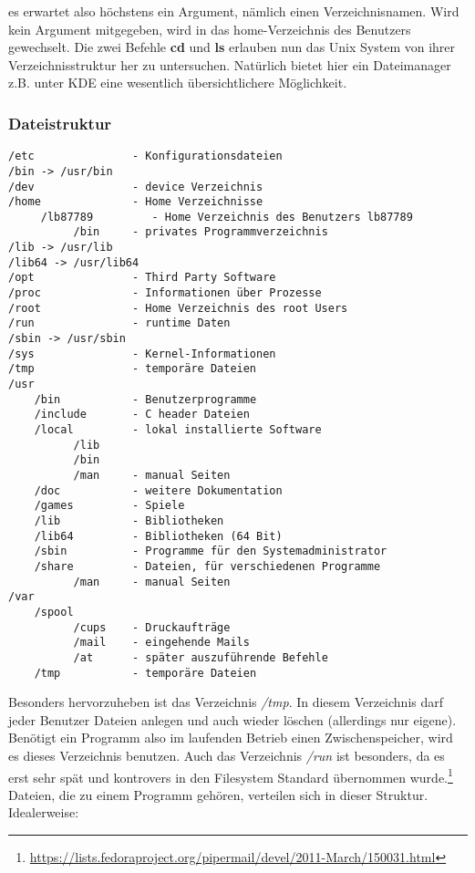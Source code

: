 \documentclass[titlepage,a4paper]{article}
\begin{document}
es erwartet also höchstens ein Argument, nämlich einen Verzeichnisnamen.  Wird
kein Argument mitgegeben, wird in das home-Verzeichnis des Benutzers
gewechselt.  Die zwei Befehle \textbf{cd} und \textbf{ls} erlauben nun das
Unix System von ihrer Verzeichnisstruktur her zu untersuchen.  Natürlich
bietet hier ein Dateimanager z.B. unter KDE eine wesentlich übersichtlichere
Möglichkeit.

\subsubsection*{Dateistruktur}

\begin{verbatim}
/etc               - Konfigurationsdateien
/bin -> /usr/bin
/dev               - device Verzeichnis
/home              - Home Verzeichnisse
     /lb87789         - Home Verzeichnis des Benutzers lb87789
          /bin     - privates Programmverzeichnis
/lib -> /usr/lib
/lib64 -> /usr/lib64
/opt               - Third Party Software
/proc              - Informationen über Prozesse
/root              - Home Verzeichnis des root Users
/run               - runtime Daten
/sbin -> /usr/sbin
/sys               - Kernel-Informationen
/tmp               - temporäre Dateien
/usr
    /bin           - Benutzerprogramme
    /include       - C header Dateien
    /local         - lokal installierte Software
          /lib
          /bin
          /man     - manual Seiten
    /doc           - weitere Dokumentation
    /games         - Spiele
    /lib           - Bibliotheken
    /lib64         - Bibliotheken (64 Bit)
    /sbin          - Programme für den Systemadministrator
    /share         - Dateien, für verschiedenen Programme
          /man     - manual Seiten
/var
    /spool
          /cups    - Druckaufträge
          /mail    - eingehende Mails
          /at      - später auszuführende Befehle
    /tmp           - temporäre Dateien
\end{verbatim}

Besonders hervorzuheben ist das Verzeichnis \emph{/tmp}.  In diesem Verzeichnis darf
jeder Benutzer Dateien anlegen und auch wieder löschen (allerdings nur eigene).
Benötigt ein Programm
also im laufenden Betrieb einen Zwischenspeicher, wird es dieses Verzeichnis
benutzen.
Auch das Verzeichnis \emph{/run} ist besonders, da es erst sehr spät und kontrovers
in den Filesystem Standard übernommen wurde.\footnote{\url{https://lists.fedoraproject.org/pipermail/devel/2011-March/150031.html}}
Dateien, die zu einem Programm gehören, verteilen sich in dieser Struktur.
Idealerweise:
\end{document}
